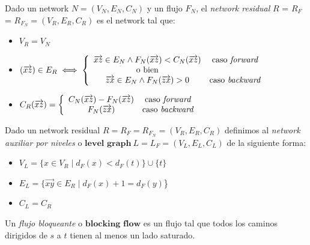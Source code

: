 \begin{definition}
Dado un network $N = (V_N, E_N, C_N)$ y un flujo $F_N$, el \emph{network residual} $R$ = $R_F$ = $R_{F_N} = (V_R, E_R, C_R)$ es el network tal que:
\begin{itemize}
    \item $V_R = V_N$
    \item $(\overrightarrow{xz}) \in E_R \iff 
    \left\{ 
    \begin{array}{cc}
    \overrightarrow{xz} \in E_N \wedge F_N(\overrightarrow{xz}) < C_N(\overrightarrow{xz})     & \text{caso \textit{forward}} \\
    \text{o bien}  & \\
    \overrightarrow{zx} \in E_N \wedge F_N(\overrightarrow{zx}) > 0 & \text{caso \textit{backward}}
    \end{array}
    \right.$
    \item $C_R(\overrightarrow{xz}) = \left\{
    \begin{array}{cc}
        C_N(\overrightarrow{xz}) -
        F_N(\overrightarrow{xz})   & \text{caso \textit{forward}}\\
        F_N(\overrightarrow{zx})   & \text{caso \textit{backward}}
    \end{array}
    \right.
    $
\end{itemize}
\end{definition}

\begin{definition}
Dado un network residual $R = R_F = R_{F_N} = (V_R, E_R, C_R)$ definimos al \emph{network auxiliar por niveles} o $\boldsymbol{level}$  $\boldsymbol{graph}\ L = L_F = (V_L, E_L, C_L)$ de la siguiente forma:
\begin{itemize}
    \item $V_L = \{ x\in V_R \mid d_F(x) < d_F(t)\} \cup \{t\}$
    \item $E_L = \{\overrightarrow{xy} \in E_R \mid d_F(x) + 1 = d_F(y)$\}
    \item $C_L = C_R$
\end{itemize}

\end{definition}

\begin{definition}
Un \emph{flujo bloqueante} o $\boldsymbol{blocking}$  $\boldsymbol{flow}$ es un flujo tal que todos los caminos dirigidos de $s$ a $t$ tienen al menos un lado saturado.
\end{definition}

